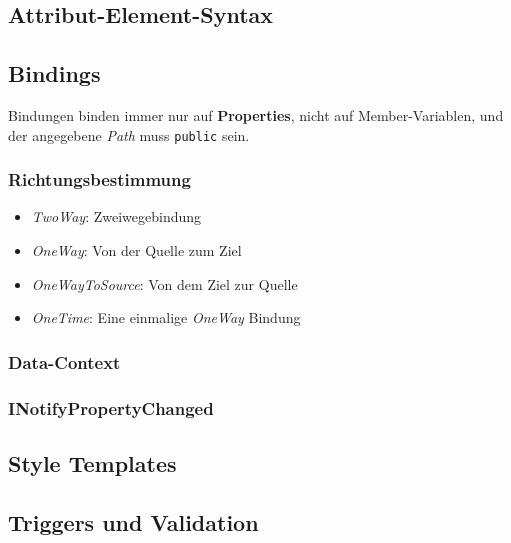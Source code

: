 \documentclass
[
	8pt,		%
	ngerman,	%
	a4paper,	%
	landscape,	%
	final		%
]{extarticle}
\begin{document}
\begin{multicols*}{3}
	\subsection{Attribut-Element-Syntax}
	
	
	\subsection{Bindings}
	Bindungen binden immer nur auf \textbf{Properties}, nicht auf
	Member-Variablen, und der angegebene \textit{Path} muss \texttt{public} sein.
	\subsubsection{Richtungsbestimmung}
	\begin{itemize}
		\item \textit{TwoWay}: Zweiwegebindung
		\item \textit{OneWay}: Von der Quelle zum Ziel
		\item \textit{OneWayToSource}: Von dem Ziel zur Quelle
		\item \textit{OneTime}: Eine einmalige \textit{OneWay} Bindung
	\end{itemize}
	\subsubsection{Data-Context}
	
	
	\subsubsection{INotifyPropertyChanged}
	
	\subsection{Style Templates}
	
	\subsection{Triggers und Validation}
	
	
\end{multicols*}
\end{document}
